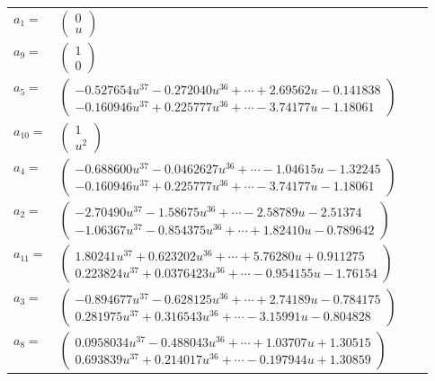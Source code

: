 \documentclass[1p]{elsarticle_modified}
\theoremstyle{definition}
\begin{document}
\begin{tabular}{m{7pt} m{180pt} m{7pt} m{180pt} }
\flushright $a_{1}=$&$\begin{pmatrix}0\\u\end{pmatrix}$ \\
\flushright $a_{9}=$&$\begin{pmatrix}1\\0\end{pmatrix}$ \\
\flushright $a_{5}=$&$\begin{pmatrix}-0.527654 u^{37}-0.272040 u^{36}+\cdots+2.69562 u-0.141838\\-0.160946 u^{37}+0.225777 u^{36}+\cdots-3.74177 u-1.18061\end{pmatrix}$ \\
\flushright $a_{10}=$&$\begin{pmatrix}1\\u^2\end{pmatrix}$ \\
\flushright $a_{4}=$&$\begin{pmatrix}-0.688600 u^{37}-0.0462627 u^{36}+\cdots-1.04615 u-1.32245\\-0.160946 u^{37}+0.225777 u^{36}+\cdots-3.74177 u-1.18061\end{pmatrix}$ \\
\flushright $a_{2}=$&$\begin{pmatrix}-2.70490 u^{37}-1.58675 u^{36}+\cdots-2.58789 u-2.51374\\-1.06367 u^{37}-0.854375 u^{36}+\cdots+1.82410 u-0.789642\end{pmatrix}$ \\
\flushright $a_{11}=$&$\begin{pmatrix}1.80241 u^{37}+0.623202 u^{36}+\cdots+5.76280 u+0.911275\\0.223824 u^{37}+0.0376423 u^{36}+\cdots-0.954155 u-1.76154\end{pmatrix}$ \\
\flushright $a_{3}=$&$\begin{pmatrix}-0.894677 u^{37}-0.628125 u^{36}+\cdots+2.74189 u-0.784175\\0.281975 u^{37}+0.316543 u^{36}+\cdots-3.15991 u-0.804828\end{pmatrix}$ \\
\flushright $a_{8}=$&$\begin{pmatrix}0.0958034 u^{37}-0.488043 u^{36}+\cdots+1.03707 u+1.30515\\0.693839 u^{37}+0.214017 u^{36}+\cdots-0.197944 u+1.30859\end{pmatrix}$ \\

\end{tabular}
\end{document}
